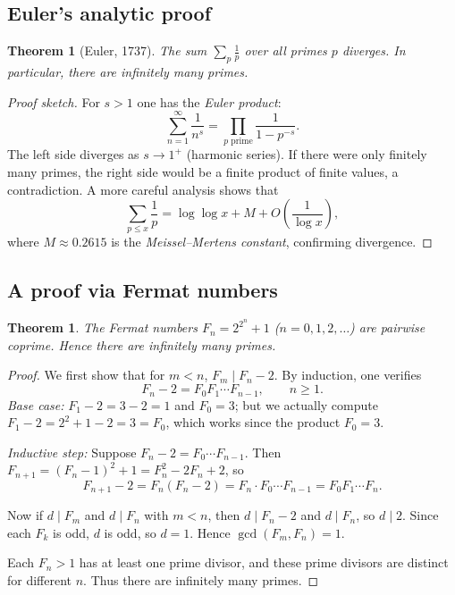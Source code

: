 \documentclass[12pt,a4paper,openany]{book}
\theoremstyle{definition}
\theoremstyle{plain}
\newtheorem{theorem}[definition]{Theorem}
\theoremstyle{remark}
\begin{document}
\subsection{Euler's analytic proof}
\label{subsec:euler-proof}

\begin{theorem}[Euler, 1737]
\label{thm:euler-infinitude}
The sum $\displaystyle\sum_{p} \frac{1}{p}$ over all primes $p$ diverges.
In particular, there are infinitely many primes.
\end{theorem}

\begin{proof}[Proof sketch]
For $s > 1$ one has the \emph{Euler product}:
\[
  \sum_{n=1}^{\infty} \frac{1}{n^s}
  = \prod_{p \text{ prime}} \frac{1}{1 - p^{-s}}.
\]
The left side diverges as $s \to 1^{+}$ (harmonic series). If there were only
finitely many primes, the right side would be a finite product of finite values,
a contradiction. A more careful analysis shows that
\[
  \sum_{p \le x} \frac{1}{p} = \log\log x + M + O\!\left(\frac{1}{\log x}\right),
\]
where $M \approx 0.2615$ is the \emph{Meissel--Mertens constant},
confirming divergence.
\end{proof}

\subsection{A proof via Fermat numbers}
\label{subsec:goldbach-proof}

\begin{theorem}
\label{thm:fermat-coprime}
The Fermat numbers $F_n = 2^{2^n} + 1$ ($n = 0, 1, 2, \ldots$) are pairwise
coprime. Hence there are infinitely many primes.
\end{theorem}

\begin{proof}
We first show that for $m < n$, $F_m \mid F_n - 2$. By induction, one verifies
\[
  F_n - 2 = F_0 F_1 \cdots F_{n-1}, \qquad n \ge 1.
\]
\emph{Base case:} $F_1 - 2 = 3 - 2 = 1$ and $F_0 = 3$; but we actually compute
$F_1 - 2 = 2^2 + 1 - 2 = 3 = F_0$, which works since the product $F_0 = 3$.

\emph{Inductive step:} Suppose $F_n - 2 = F_0 \cdots F_{n-1}$. Then
$F_{n+1} = (F_n - 1)^2 + 1 = F_n^2 - 2F_n + 2$, so
\[
  F_{n+1} - 2 = F_n(F_n - 2) = F_n \cdot F_0 \cdots F_{n-1} = F_0 F_1 \cdots F_n.
\]

Now if $d \mid F_m$ and $d \mid F_n$ with $m < n$, then $d \mid F_n - 2$ and
$d \mid F_n$, so $d \mid 2$. Since each $F_k$ is odd, $d$ is odd, so $d = 1$.
Hence $\gcd(F_m, F_n) = 1$.

Each $F_n > 1$ has at least one prime divisor, and these prime divisors are
distinct for different $n$. Thus there are infinitely many primes.
\end{proof}
\end{document}
